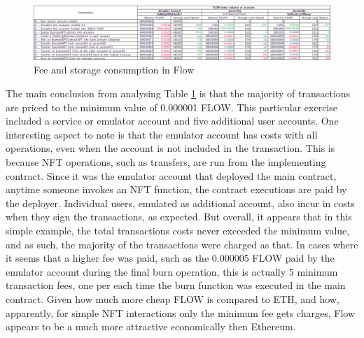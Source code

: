 \documentclass[../main.tex]{subfiles}
\begin{document}
\begin{figure}[htp]
    \centering
    \includegraphics[width=1.0\textwidth]{../Images/09_FlowFeeCalculations.png}
    \caption{Fee and storage consumption in Flow}
    \label{fig:cadence_gas_cost}
\end{figure}

The main conclusion from analysing Table \ref{fig:cadence_gas_cost} is that the majority of transactions are priced to the minimum value of 0.000001 FLOW. This particular exercise included a service or emulator account and five additional user accounts. One interesting aspect to note is that the emulator account has costs with all operations, even when the account is not included in the transaction. This is because NFT operations, such as transfers, are run from the implementing contract. Since it was the emulator account that deployed the main contract, anytime someone invokes an NFT function, the contract executions are paid by the deployer. Individual users, emulated as additional account, also incur in costs when they sign the transactions, as expected. But overall, it appears that in this simple example, the total transactions costs never exceeded the minimum value, and as such, the majority of the transactions were charged as that. In cases where it seems that a higher fee was paid, such as the 0.000005 FLOW paid by the emulator account during the final burn operation, this is actually 5 minimum transaction fees, one per each time the burn function was executed in the main contract. Given how much more cheap FLOW is compared to ETH, and how, apparently, for simple NFT interactions only the minimum fee gets charges, Flow appears to be a much more attractive economically then Ethereum.
\end{document}
